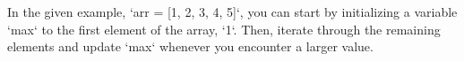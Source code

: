 \documentclass[preview]{standalone}
\begin{document}
In the given example, `arr = [1, 2, 3, 4, 5]`, you can start by initializing a variable `max` to the first element of the array, `1`. Then, iterate through the remaining elements and update `max` whenever you encounter a larger value.\\
\end{document}

